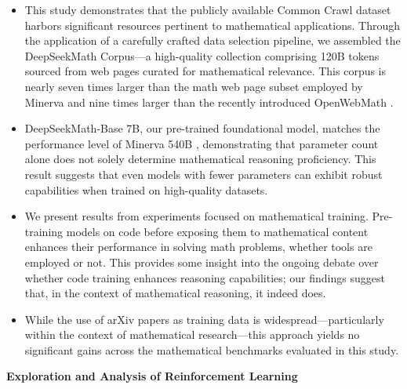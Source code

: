 \begin{itemize}[topsep=0pt]
    \item This study demonstrates that the publicly available Common Crawl dataset harbors significant resources pertinent to mathematical applications. Through the application of a carefully crafted data selection pipeline, we assembled the DeepSeekMath Corpus—a high-quality collection comprising 120B tokens sourced from web pages curated for mathematical relevance. This corpus is nearly seven times larger than the math web page subset employed by Minerva \citep{minerva} and nine times larger than the recently introduced OpenWebMath \citep{openwebmath}.

\item DeepSeekMath-Base 7B, our pre-trained foundational model, matches the performance level of Minerva 540B \citep{minerva}, demonstrating that parameter count alone does not solely determine mathematical reasoning proficiency. This result suggests that even models with fewer parameters can exhibit robust capabilities when trained on high-quality datasets.

\item We present results from experiments focused on mathematical training. Pre-training models on code before exposing them to mathematical content enhances their performance in solving math problems, whether tools are employed or not. This provides some insight into the ongoing debate over whether code training enhances reasoning capabilities; our findings suggest that, in the context of mathematical reasoning, it indeed does.

\item While the use of arXiv papers as training data is widespread—particularly within the context of mathematical research—this approach yields no significant gains across the mathematical benchmarks evaluated in this study.
\end{itemize}

\textbf{Exploration and Analysis of Reinforcement Learning}

